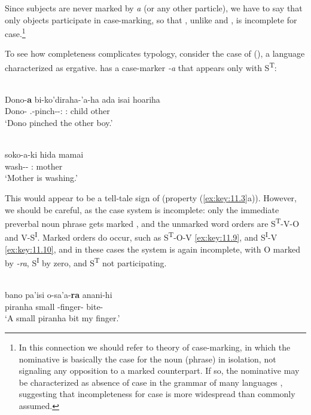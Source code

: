 \documentclass[output=paper]{langsci/langscibook}
\begin{document}
\largerpage[2]
Since subjects are never marked by \emph{a} (or any other particle), we have to
say that only objects participate in case-marking, so that , unlike
 and , is incomplete for case.\footnote{In
    this connection we should refer to  theory of
    case-marking, in which the nominative is basically the case for the noun
    (phrase) in isolation, not signaling any opposition to a marked
    counterpart. If so, the nominative may be characterized as absence of case
in the grammar of many languages \citep{Zwart1988}, suggesting that
incompleteness for case is more widespread than commonly assumed.}

To see how completeness complicates  typology, consider the case of
 (\citealt{ChapmanDerbyshire1991}), a language characterized as
ergative.  has a case-marker \emph{-a} that appears only with
S\textsuperscript{T}:

\ea%
    \label{ex:key:11.7} {\parencite[164]{ChapmanDerbyshire1991}}\\
    \gll Dono-\textbf{a}  bi-ko’diraha-’a-ha      ada    isai    hoariha\\
        Dono-\Erg{}  \Tsg.\Tr{}-pinch-\Asp-\Th:\M{}  \Dem:\M{}  child  other\\
    \glt ‘Dono pinched the other boy.’
\z

\ea%
    \label{ex:key:11.8} {\parencite[163]{ChapmanDerbyshire1991}}\\
    \gll soko-a-ki      hida    mamai\\
        wash-\Detr-\Nth{}  \Dem:\glossF{}  mother\\
    \glt ‘Mother is washing.’
\z

This would appear to be a tell-tale sign of  (property (\ref{ex:key:11.3}a)).
However, we should be careful, as the case system is incomplete: only the
immediate preverbal noun phrase gets marked
\parencite[250]{ChapmanDerbyshire1991}, and the unmarked word orders are
S\textsuperscript{T}{}-V-O and V-S\textsuperscript{I}. Marked orders do occur,
such as S\textsuperscript{T}{}-O-V \eqref{ex:key:11.9}, and S\textsuperscript{I}{}-V \eqref{ex:key:11.10}, and
in these cases the system is again incomplete, with O marked by \emph{{}-ra},
S\textsuperscript{I} by zero, and S\textsuperscript{T} not participating.

\ea%
    \label{ex:key:11.9} {\parencite[197]{ChapmanDerbyshire1991}}\\
    \gll bano    pa'isi  o-sa'a-\textbf{ra}      anani-hi\\
        piranha  small  \Fsg{}-finger-\Obj{}  bite-\Th{}\\
    \glt ‘A small piranha bit my finger.’
\z
\end{document}
